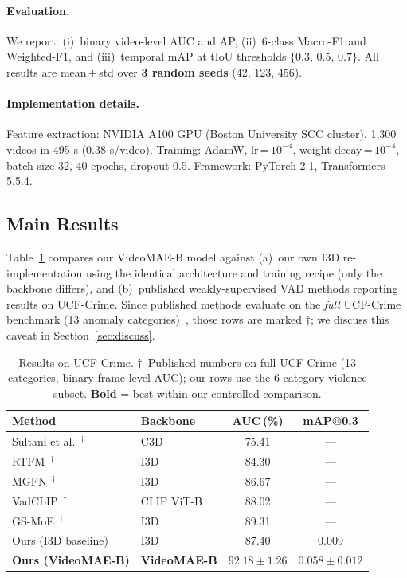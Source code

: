 \documentclass[sigconf,nonacm]{acmart}
\begin{document}
\paragraph{Evaluation.}
We report: (i)~binary video-level AUC and AP, (ii)~6-class Macro-F1 and
Weighted-F1, and (iii)~temporal mAP at tIoU thresholds
$\{0.3,\,0.5,\,0.7\}$.
All results are mean\,$\pm$\,std over \textbf{3 random seeds} (42, 123, 456).

\paragraph{Implementation details.}
Feature extraction: NVIDIA A100 GPU (Boston University SCC cluster),
1{,}300 videos in 495 s (0.38 s/video).
Training: AdamW, lr\,=\,$10^{-4}$, weight decay\,=\,$10^{-4}$,
batch size 32, 40 epochs, dropout 0.5.
Framework: PyTorch 2.1, Transformers 5.5.4.

\subsection{Main Results}

Table~\ref{tab:main} compares our VideoMAE-B model against (a)~our own I3D
re-implementation using the identical architecture and training recipe
(only the backbone differs), and (b)~published weakly-supervised VAD methods
reporting results on UCF-Crime.
Since published methods evaluate on the \emph{full} UCF-Crime benchmark
(13 anomaly categories)~\cite{sultani2018real}, those rows are marked
$\dagger$; we discuss this caveat in Section~\ref{sec:discuss}.

\begin{table}[t]
  \centering
  \caption{Results on UCF-Crime.
           $\dagger$~Published numbers on full UCF-Crime (13 categories,
           binary frame-level AUC); our rows use the 6-category violence
           subset. \textbf{Bold} = best within our controlled comparison.}
  \label{tab:main}
  \small
  \begin{tabular}{l l c c}
    \toprule
    \textbf{Method} & \textbf{Backbone} & \textbf{AUC\,(\%)} & \textbf{mAP@0.3} \\
    \midrule
    Sultani et al.~\cite{sultani2018real}$^\dagger$ & C3D        & 75.41 & ---  \\
    RTFM~\cite{tian2021weakly}$^\dagger$            & I3D        & 84.30 & ---  \\
    MGFN~\cite{chen2023mgfn}$^\dagger$              & I3D        & 86.67 & ---  \\
    VadCLIP~\cite{wu2024vadclip}$^\dagger$          & CLIP ViT-B & 88.02 & ---  \\
    GS-MoE~\cite{wang2025gsmoe}$^\dagger$           & I3D        & 89.31 & ---  \\
    \midrule
    Ours (I3D baseline)    & I3D         & 87.40               & 0.009 \\
    \textbf{Ours (VideoMAE-B)} & \textbf{VideoMAE-B}
                           & $\mathbf{92.18 \pm 1.26}$ & $\mathbf{0.058 \pm 0.012}$ \\
    \bottomrule
  \end{tabular}
\end{table}
\end{document}
